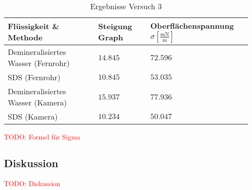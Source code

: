             \begin{table}[H]
                \centering
                \caption{Ergebnisse Versuch 3}
                \label{tab:Versuch3_Ergebnisse}
                \vspace{0.8em}
                \begin{tabular}{|l|l|l|}
                    \hline
                    Flüssigkeit \& Methode & Steigung Graph & Oberflächenspannung $\sigma \mathrm{\left[\frac{mN}{m}\right]}$\\
                    \hline \hline
                    Demineralisiertes Wasser (Fernrohr) & $14.845$ & $72.596$\\
                    \hline
                    SDS (Fernrohr) & $10.845$ & $53.035$\\
                    \hline
                    Demineralisiertes Wasser (Kamera) & $15.937$ & $77.936$\\
                    \hline
                    SDS (Kamera) & $10.234$ & $50.047$\\
                    \hline
                \end{tabular}
            \end{table}

            \textcolor{red}{TODO: Formel für Sigma}

        \subsection{Diskussion}

            \textcolor{red}{TODO: Diskussion}